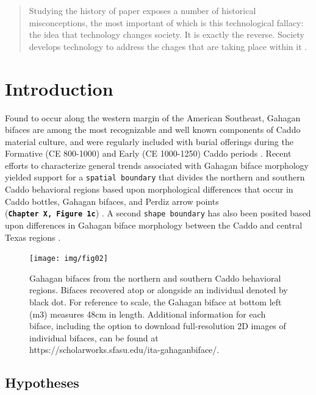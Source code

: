 \documentclass[]{interact}
\theoremstyle{plain}%
\theoremstyle{definition}
\theoremstyle{remark}
\begin{document}
\begin{quote}
Studying the history of paper exposes a number of historical
misconceptions, the most important of which is this technological
fallacy: the idea that technology changes society. It is exactly the
reverse. Society develops technology to address the chages that are
taking place within it \citep[xiv]{RN10878}.
\end{quote}

\hypertarget{introduction}{%
\section{Introduction}\label{introduction}}

Found to occur along the western margin of the American Southeast,
Gahagan bifaces are among the most recognizable and well known
components of Caddo material culture, and were regularly included with
burial offerings during the Formative (CE 800-1000) and Early (CE
1000-1250) Caddo periods
\citep{RN7115,RN8189,RN5746,RN8186,RN8174,RN8176}. Recent efforts to
characterize general trends associated with Gahagan biface morphology
yielded support for a \texttt{spatial\ boundary} that divides the
northern and southern Caddo behavioral regions based upon morphological
differences that occur in Caddo bottles, Gahagan bifaces, and Perdiz
arrow points (\textbf{\texttt{Chapter\ X,\ Figure\ 1c}})
\citep{RN7925,RN8071,RN8361,RN8967,RN11064,RN8154}. A second
\texttt{shape\ boundary} has also been posited based upon differences in
Gahagan biface morphology between the Caddo and central Texas regions
\citep{RN8318}.

\begin{figure}

{\centering \texttt{[image: img/fig02]} 

}

\caption{Gahagan bifaces from the northern and southern Caddo behavioral regions. Bifaces recovered atop or alongside an individual denoted by black dot. For reference to scale, the Gahagan biface at bottom left (m3) measures 48cm in length. Additional information for each biface, including the option to download full-resolution 2D images of individual bifaces, can be found at https://scholarworks.sfasu.edu/ita-gahaganbiface/.}\label{fig:gahagan bifaces 2D}
\end{figure}

\hypertarget{hypotheses}{%
\subsection{Hypotheses}\label{hypotheses}}
\end{document}
